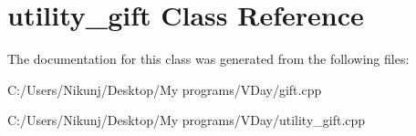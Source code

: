 \hypertarget{classutility__gift}{}\section{utility\+\_\+gift Class Reference}
\label{classutility__gift}


The documentation for this class was generated from the following files\+:\begin{DoxyCompactItemize}
\item 
C\+:/\+Users/\+Nikunj/\+Desktop/\+My programs/\+V\+Day/gift.\+cpp\item 
C\+:/\+Users/\+Nikunj/\+Desktop/\+My programs/\+V\+Day/utility\+\_\+gift.\+cpp\end{DoxyCompactItemize}
